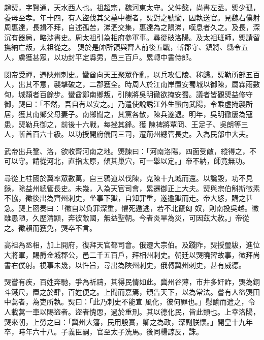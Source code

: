 
\begin{pinyinscope}

 趙煚，字賢通，天水西人也。祖超宗，魏河東太守。父仲懿，尚書左丞。煚少孤，養母至孝。年十四，有人盜伐其父墓中樹者，煚對之號慟，因執送官。見魏右僕射周惠達，長揖不拜，自述孤苦，涕泗交集，惠達為之隕涕，嘆息者久之。及長，深沉有器局，略涉書史。周太祖引為相府參軍事。尋從破洛陽。及太祖班師，煚請留撫納亡叛，太祖從之。
 煚於是帥所領與齊人前後五戰，斬郡守、鎮將、縣令五人，虜獲甚眾，以功封平定縣男，邑三百戶。累轉中書侍郎。



 閔帝受禪，遷陜州刺史。蠻酋向天王聚眾作亂，以兵攻信陵、秭歸。煚勒所部五百人，出其不意，襲擊破之，二郡獲全。時周人於江南岸置安蜀城以御陳，屬霖雨數旬，城頹者百餘步。蠻酋鄭南鄉叛，引陳將吳明徹欲掩安蜀。議者皆觀煚益修守御，煚曰：「不然，吾自有以安之。」乃遣使說誘江外生蠻向武陽，令乘虛掩襲所居，獲其南鄉父母妻子。南鄉聞之，其黨各散，陳兵遂退。明年，吳明徹屢為寇患，煚勒兵御之，前後十六戰，每挫其鋒。獲
 陳裨將覃冏、王足子、吳朗等三人，斬首百六十級。以功授開府儀同三司，遷荊州總管長史。入為民部中大夫。



 武帝出兵鞏、洛，欲收齊河南之地。煚諫曰：「河南洛陽，四面受敵，縱得之，不可以守。請從河北，直指太原，傾其巢穴，可一舉以定。」帝不納，師竟無功。



 尋從上柱國於翼率眾數萬，自三鴉道以伐陳，克陳十九城而還。以讒毀，功不見錄，除益州總管長史。未幾，入為天官司會，累遷御正上大夫。煚與宗伯斛斯徵素不協，徵後出為齊州刺史，坐事下獄，自知罪重，遂逾獄而走。帝大怒，購之甚急。煚上密奏曰：「徵自以負罪深重，懼死遁逃，若不北竄匈
 奴，則南投吳越。徵雖愚陋，久歷清顯，奔彼敵國，無益聖朝。今者炎旱為災，可因茲大赦。」帝從之。徵賴而獲免，煚卒不言。



 高祖為丞相，加上開府，復拜天官都司會。俄遷大宗伯。及踐阼，煚授璽紱，進位大將軍，賜爵金城郡公，邑二千五百戶，拜相州刺史。朝廷以煚曉習故事，徵拜尚書右僕射。視事未幾，以忤旨，尋出為陜州刺史，俄轉冀州刺史，甚有威德。



 煚嘗有疾，百姓奔馳，爭為祈禱，其得民情如此。冀州谷薄，市井多奸詐，煚為銅斗鐵尺，置之於肆，百姓便之。上聞而嘉焉，頒告天下，以為常法。嘗有人盜煚田中蒿者，為吏所執。煚曰：「此乃刺史不能宣
 風化，彼何罪也。」慰諭而遣之，令人載蒿一車以賜盜者。盜者愧恧，過於重刑。其以德化民，皆此類也。上幸洛陽，煚來朝，上勞之曰：「冀州大籓，民用殷實，卿之為政，深副朕懷。」開皇十九年卒，時年六十八。子義臣嗣，官至太子洗馬。後同楊諒反，誅。




\end{pinyinscope}
